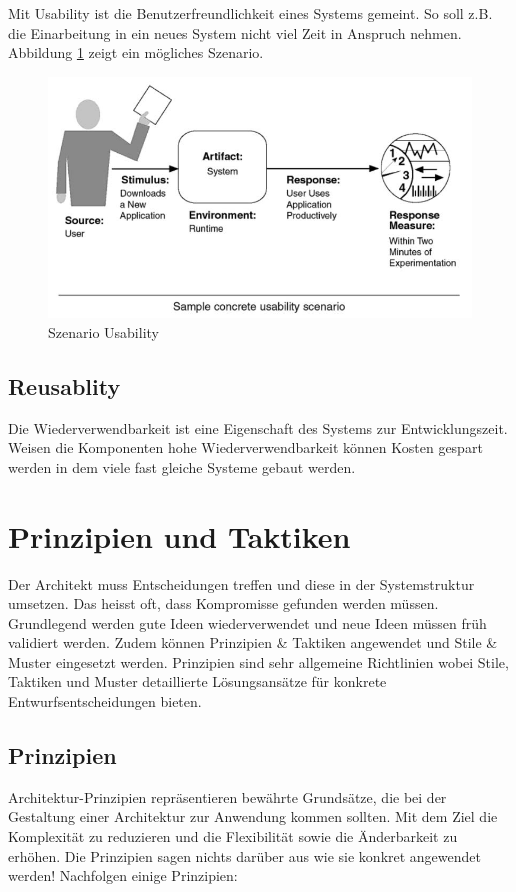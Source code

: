 Mit Usability ist die Benutzerfreundlichkeit eines Systems gemeint. So soll z.B. die Einarbeitung in ein neues System nicht viel Zeit in Anspruch nehmen. Abbildung \ref{fig:usability} zeigt ein mögliches Szenario.

\begin{figure}[h!]
\centering
\includegraphics[width=0.7\linewidth]{fig/usability}
\caption{Szenario Usability}
\label{fig:usability}
\end{figure}

\subsection{Reusablity}

Die Wiederverwendbarkeit ist eine Eigenschaft des Systems zur Entwicklungszeit. Weisen die Komponenten hohe Wiederverwendbarkeit können Kosten gespart werden in dem viele fast gleiche Systeme gebaut werden.

\section{Prinzipien und Taktiken}
Der Architekt muss Entscheidungen treffen und diese in der Systemstruktur umsetzen. Das heisst oft, dass Kompromisse gefunden werden müssen. Grundlegend werden gute Ideen wiederverwendet und neue Ideen müssen früh validiert werden. Zudem können Prinzipien \& Taktiken angewendet und Stile \& Muster eingesetzt werden. Prinzipien sind sehr allgemeine Richtlinien wobei Stile, Taktiken und Muster detaillierte Lösungsansätze für konkrete Entwurfsentscheidungen bieten.

\subsection{Prinzipien}
Architektur-Prinzipien repräsentieren bewährte Grundsätze, die bei der Gestaltung einer Architektur zur Anwendung kommen sollten. Mit dem Ziel die Komplexität zu reduzieren und die Flexibilität sowie die Änderbarkeit zu erhöhen. Die Prinzipien sagen nichts darüber aus wie sie konkret angewendet werden! Nachfolgen einige Prinzipien:

